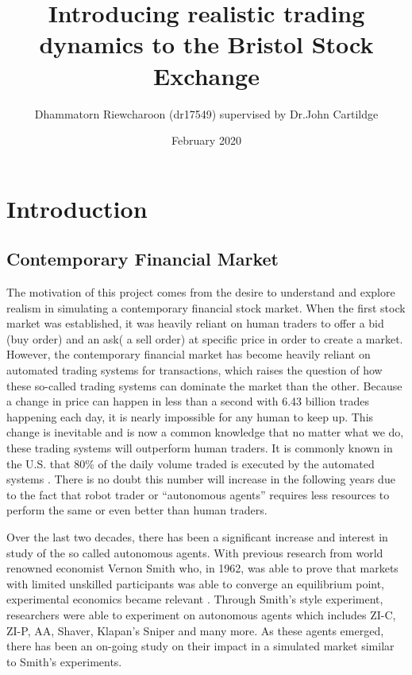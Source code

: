 \documentclass{article}
\title{ Introducing realistic trading dynamics to the Bristol Stock Exchange}
\author{Dhammatorn Riewcharoon (dr17549) supervised by Dr.John Cartildge }
\date{February 2020}
\begin{document}
\tableofcontents{}
\maketitle

\section{Introduction}
\subsection{Contemporary Financial Market} 
The motivation of this project comes from the desire to understand and explore realism in simulating a contemporary financial stock market. When the first stock market was established, it was heavily reliant on human traders to offer a bid (buy order) and an ask( a sell order) at specific price in order to create a market. However, the contemporary financial market has become heavily reliant on automated trading systems for transactions, which raises the question of how these so-called trading systems can dominate the market than the other. Because a change in price can happen in less than a second with 6.43 billion trades happening each day, it is nearly impossible for any human to keep up.\cite{dailytrade} This change is inevitable and is now a common knowledge that no matter what we do, these trading systems will outperform human traders. It is commonly known in the U.S. that 80\% of the daily volume traded is executed by the automated systems \cite{percentAgent}. There is no doubt this number will increase in the following years due to the fact that robot trader or ``autonomous agents” requires less resources to perform the same or even better than human traders. 

Over the last two decades, there has been a significant increase and interest in study of the so called autonomous agents. With previous research from world renowned economist Vernon Smith who, in 1962, was able to prove that markets with limited unskilled participants was able to converge an equilibrium point, experimental economics became relevant \cite{smith1962}. Through Smith’s style experiment, researchers were able to experiment on autonomous agents which includes ZI-C, ZI-P, AA, Shaver, Klapan’s Sniper and many more. As these agents emerged, there has been an on-going study on their impact in a simulated market similar to Smith's experiments.  
\end{document}
